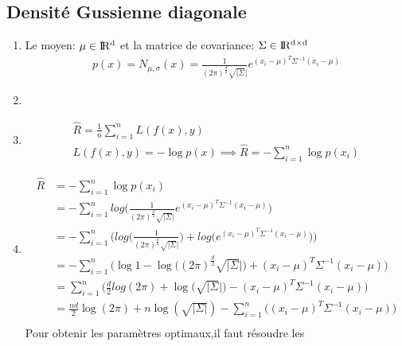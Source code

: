 \documentclass{article}
\begin{document}
\subsection{Densité Gussienne diagonale}
\begin{enumerate}[label=(\alph*)]
\item Le moyen: $\mu \in \rm I\!R^d $ et la matrice de covariance: $\Sigma
  \in \rm I\!R^{d \times d} $\\
  \begin{align*}
    p(x)=N_{\mu , \sigma}(x) = \frac{1}{(2 \pi)^\frac{d}{2} \sqrt{|\Sigma}|}e^{(x_i - \mu)^T\Sigma^{-1}(x_i - \mu)}
  \end{align*}
  
\item
\item
  \begin{align*}
    \hat{R} = \frac{1}{n}\sum_{i=1}^{n}L(f(x),y)\\
    L(f(x),y) = -\log{p(x)} \implies
    \hat{R} = -\sum_{i=1}^{n}\log{p(x_i)}
  \end{align*}
\item
  \begin{align*}
    \hat{R} &= -\sum_{i=1}^{n}{
              \log{p(x_i)}}\\
            &= -\sum_{i=1}^{n}{
              log{\Big(
              \frac{1}{(2 \pi)^\frac{d}{2}\sqrt{|\Sigma}|}
              e^{(x_i - \mu)^T\Sigma^{-1}(x_i-\mu)}}\Big)}\\
            &= -\sum_{i=1}^{n}\Bigg(
              log{\Big(\frac{1}{(2 \pi)^\frac{d}{2}\sqrt{|\Sigma}                   |}
              \Big)}+
              log{\Big(
              e^{(x_i - \mu)^T\Sigma^{-1}(x_i-\mu)}}
              \Big)
              \Bigg)\\
            &= -\sum_{i=1}^{n}\Bigg(
              \log{1} -\log{\Big({(2 \pi)^\frac{d}{2}\sqrt{|\Sigma}                   |}
              \Big)}+
              (x_i - \mu)^T\Sigma^{-1}(x_i-\mu)
              \Bigg)\\
            &= \sum_{i=1}^{n}\Bigg(
              \frac{d}{2}log{{(2 \pi)+\log(\sqrt{|\Sigma}|})
              }-
              (x_i - \mu)^T\Sigma^{-1}(x_i-\mu)
              \Bigg)\\
            &= \frac{nd}{2}\log(2 \pi)+
              n\log(\sqrt{|\Sigma|}) -\sum_{i=1}^{n}\Big(
              (x_i - \mu)^T\Sigma^{-1}(x_i-\mu)
              \Big)\\
  \end{align*}
  Pour obtenir les paramètres optimaux,il faut résoudre les

\end{enumerate}
\end{document}
